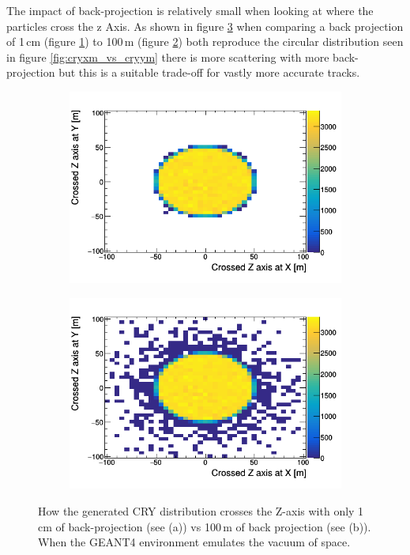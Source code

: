 The impact of back-projection is relatively small when looking at where the particles cross the z Axis. As shown in figure \ref{fig:Crossed_atZ_XY_AndShort} when comparing a back projection of 1\,cm (figure \ref{subFig:CrossedZAxisShort}) to 100\,m (figure \ref{subFig:Crossed_atZ_XY}) both reproduce the circular distribution seen in figure \ref{fig:cryxm_vs_cryym} there is more scattering with more back-projection but this is a suitable trade-off for vastly more accurate tracks. 

\begin{figure}[!h]
\centering
\begin{subfigure}{.5\textwidth}
  \centering
  \includegraphics[width=\linewidth]{Chapter4/Figs/Raster/CryPlots/CrossedZAxisShort.png}
  \captionsetup{width=.9\linewidth}
  \caption{}
  \label{subFig:CrossedZAxisShort}
\end{subfigure}%
\begin{subfigure}{.5\textwidth}
  \centering
  \includegraphics[width=\linewidth]{Chapter4/Figs/Raster/CryPlots/Crossed_atZ_XY.png}
  \captionsetup{width=.9\linewidth}
  \caption{}
  \label{subFig:Crossed_atZ_XY}
\end{subfigure}
\caption{How the generated CRY distribution crosses the Z-axis with only 1\,cm of back-projection (see (a)) vs 100\,m of back projection (see (b)). When the GEANT4 environment emulates the vacuum of space.}
\label{fig:Crossed_atZ_XY_AndShort}
\end{figure}

